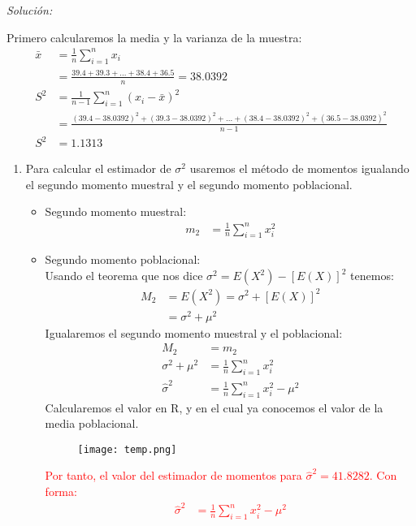 \documentclass[12pt]{article}
\newenvironment{sol}
    {\emph{Solución:}
    }
    {
    }
\begin{document}
\begin{sol}
Primero calcularemos la media y la varianza de la muestra:
\begin{align*}
\bar{x} &= \frac{1}{n}\sum_{i=1}^n x_i \\
&= \frac{39.4+39.3+...+38.4+36.5}{n}=38.0392 \\
S^2 &= \frac{1}{n-1} \sum_{i=1}^{n} (x_i - \bar{x})^2 \\
&=\frac{(39.4-38.0392)^2 + (39.3-38.0392)^2 +...+(38.4-38.0392)^2 +(36.5-38.0392)^2 }{n-1}\\
S^2 &=1.1313 
\end{align*}

\begin{enumerate}[label=\alph*)] %
    \item Para calcular el estimador de $\sigma^2$ usaremos el método de momentos igualando el segundo momento muestral y el segundo momento poblacional.
    \begin{itemize}

\item Segundo momento muestral:
\begin{align*}
m_2 &= \frac{1}{n}\sum_{i=1}^nx_i^2
\end{align*}

\pagebreak
 
\item Segundo momento poblacional:\\
Usando el teorema que nos dice $\sigma^2 = E(X^2)-[E(X)]^2$ tenemos:
\begin{align*}
M_2 &= E(X^2)=\sigma^2+[E(X)]^2\\
&= \sigma^2 + \mu^2
\end{align*}
Igualaremos el segundo momento muestral y el poblacional:
\begin{align*}
M_2 &= m_2\\
\sigma^2+\mu^2 &= \frac{1}{n}\sum_{i=1}^nx_i^2 \\
\hat{\sigma}^2 &=  \frac{1}{n}\sum_{i=1}^nx_i^2-\mu^2
\end{align*}
Calcularemos el valor en R, y en el cual ya conocemos el valor de la media poblacional.\\

\begin{figure}[h]  %
    \centering      %
    \texttt{[image: temp.png]} 
\end{figure}

 \textcolor{red}{%
    Por tanto, el valor del estimador de momentos para $\hat{\sigma}^2 = 41.8282$. Con forma:
  \begin{align*}
  \hat{\sigma}^2 &=  \frac{1}{n}\sum_{i=1}^nx_i^2-\mu^2
  \end{align*}
}
   \pagebreak
   

\end{itemize}
\end{enumerate}
\end{sol}
\end{document}

